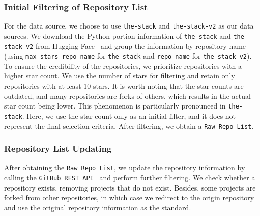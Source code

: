 \subsubsection{Initial Filtering of Repository List} \label{sec:Initial}

For the data source, we choose to use \texttt{the-stack} and \texttt{the-stack-v2} as our data sources. We download the Python portion information of \texttt{the-stack} and \texttt{the-stack-v2} from Hugging Face~\cite{Hugging-Face} and group the information by repository name (using \texttt{max\_stars\_repo\_name} for \texttt{the-stack} and \texttt{repo\_name} for \texttt{the-stack-v2}). To ensure the credibility of the repositories, we prioritize repositories with a higher star count. We use the number of stars for filtering and retain only repositories with at least 10 stars. It is worth noting that the star counts are outdated, and many repositories are forks of others, which results in the actual star count being lower. This phenomenon is particularly pronounced in \texttt{the-stack}. Here, we use the star count only as an initial filter, and it does not represent the final selection criteria. After filtering, we obtain a \texttt{Raw Repo List}.


\subsubsection{Repository List Updating}

After obtaining the \texttt{Raw Repo List}, we update the repository information by calling the \texttt{GitHub REST API}~\cite{github-rest-api} and perform further filtering. We check whether a repository exists, removing projects that do not exist. Besides, some projects are forked from other repositories, in which case we redirect to the origin repository and use the original repository information as the standard.

